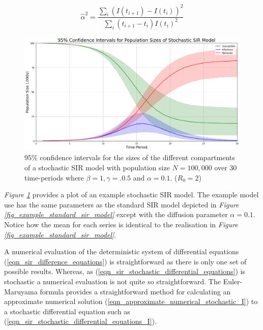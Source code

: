 \documentclass[11pt,a4paper]{article}
\theoremstyle{break}
\begin{document}
  \begin{equation}\label{eqn_estimate_alpha}
    \hat\alpha^2=\frac{\sum_i\left(I(t_{i+1})-I(t_i)\right)^2}{\sum_i\left(t_{i+1}-t_i\right)I(t_i)^2}
  \end{equation}

  \begin{figure}[H]
    \centering\includegraphics[width=.9\textwidth]{example_stochastic_sir_model.png}
    \caption{95\% confidence intervals for the sizes of the different compartments of a stochastic SIR model with population size $N=100,000$ over 30 time-periods where $\beta=1,\gamma=.0.5$ and $\alpha=0.1$. ($R_0=2$)}
    \label{fig_example_stochastic_sir_model}
  \end{figure}

  \par \textit{Figure \ref{fig_example_stochastic_sir_model}} provides a plot of an example stochastic SIR model. The example model use has the same parameters as the standard SIR model depicted in \textit{Figure \ref{fig_example_standard_sir_model}} except with the diffusion parameter $\alpha=0.1$. Notice how the mean for each series is identical to the realisation in \textit{Figure \ref{fig_example_standard_sir_model}}.

  \par A numerical evaluation of the deterministic system of differential equations (\ref{eqn_sir_difference_equations}) is straightforward as there is only one set of possible results. Whereas, as (\ref{eqn_sir_stochastic_differential_equations}) is stochastic a numerical evaluation is not quite so straightforward. The Euler-Maruyama formula \cite[]{on_one_step_method_of_euler_maruyama} provides a straightforward method for calculating an approximate numerical solution (\ref{eqn_approximate_numerical_stochastic_I}) to a stochastic differential equation such as (\ref{eqn_sir_stochastic_differential_equations_I}).
\end{document}
